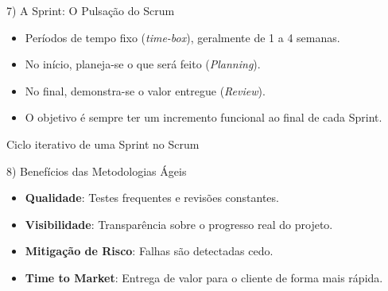 \documentclass[aspectratio=169]{beamer}
\begin{document}
\begin{frame}{7) A Sprint: O Pulsação do Scrum}

\begin{itemize}
    \item Períodos de tempo fixo (\textit{time-box}), geralmente de 1 a 4 semanas.
    \item No início, planeja-se o que será feito (\textit{Planning}).
    \item No final, demonstra-se o valor entregue (\textit{Review}).
    \item O objetivo é sempre ter um incremento funcional ao final de cada Sprint.
\end{itemize}

\vspace{0.5cm}

\centering
{}

\vspace{0.3cm}
\small{Ciclo iterativo de uma Sprint no Scrum}

\end{frame}

\begin{frame}{8) Benefícios das Metodologias Ágeis}
  \begin{itemize}
    \item \textbf{Qualidade}: Testes frequentes e revisões constantes.
    \item \textbf{Visibilidade}: Transparência sobre o progresso real do projeto.
    \item \textbf{Mitigação de Risco}: Falhas são detectadas cedo.
    \item \textbf{Time to Market}: Entrega de valor para o cliente de forma mais rápida.
  \end{itemize}
\end{frame}
\end{document}
